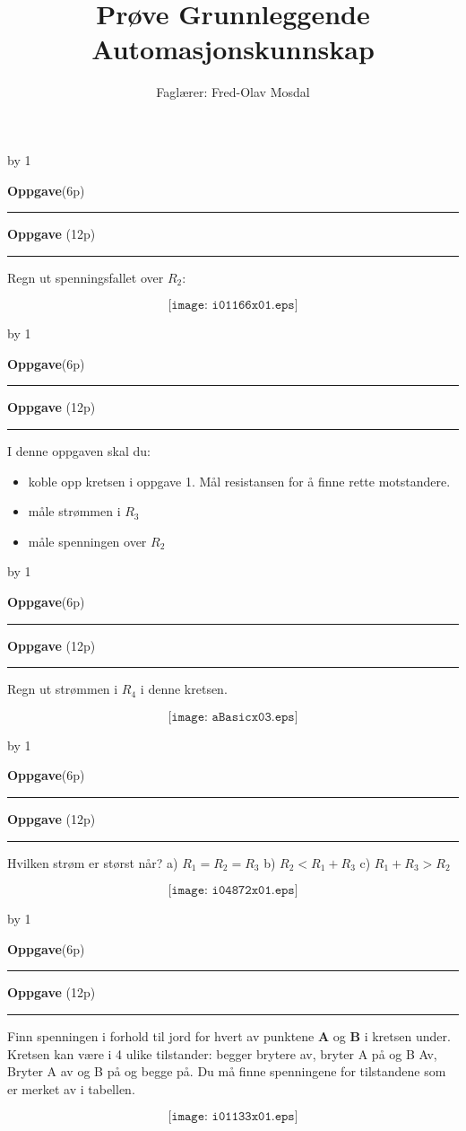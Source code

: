 \documentclass[12pt,a4paper]{article}
\def\oppgave{
            \advance\questnum by 1
	    \ifthenelse{\questnum>0\AND \questnum<9}
	    {
                \vskip 1cm
		\textbf{Oppgave}\hskip 5pt\the\questnum \hfill \hfill(6p)
		\vskip 3pt
		\hrule
	\vskip 0.5cm}
	{
                \vskip 1cm
		\textbf{Oppgave}\hskip 5pt \the\questnum \hfill \hfill(12p)
		\vskip 3pt \hrule \vskip 0.5cm }

		}
\begin{document}
\title{Prøve Grunnleggende Automasjonskunnskap}
\author{Faglærer: Fred-Olav Mosdal\\}
\maketitle
\oppgave{}%
\vskip 2.5pt 
Regn ut spenningsfallet over $R_2$:

$$\texttt{[image: i01166x01.eps]}$$
\vskip 2.5pt 

\vskip 2.5pt 

\vskip 2.5pt 
\newpage
\oppgave{}%
\vskip 2.5pt 
I denne oppgaven skal du:
\begin{itemize}
	\item koble opp kretsen i oppgave 1. Mål resistansen for å finne rette motstandere. 
	\item måle strømmen i $R_3$
	\item måle spenningen over $R_2$
\end{itemize}
\vskip 2.5pt 
\newpage
\oppgave{}%
\vskip 2.5pt 
Regn ut strømmen i $R_4$ i denne kretsen. 

$$\texttt{[image: aBasicx03.eps]}$$

\vskip 2.5pt 

\vskip 2.5pt 
\newpage


\oppgave{}%
\vskip 2.5pt 
Hvilken strøm er størst når?
\vskip 10pt
a) $R_1=R_2=R_3$
\vskip 10pt
b) $R_2<R_1 + R_3$
\vskip 10pt
c) $R_1+R_3>R_2$
\vskip 10pt

$$\texttt{[image: i04872x01.eps]}$$

\vskip 5pt 
\vskip 2.5pt 
\newpage
\oppgave{}%
\vskip 2.5pt 
Finn spenningen i forhold til jord for hvert av punktene \textbf{A} og \textbf{B} i kretsen under. 
Kretsen kan være i 4 ulike tilstander: begger brytere av, bryter A på og B Av, Bryter A av og B på og begge på. Du må finne spenningene for tilstandene som er merket av i tabellen. 

$$\texttt{[image: i01133x01.eps]}$$
\end{document}
